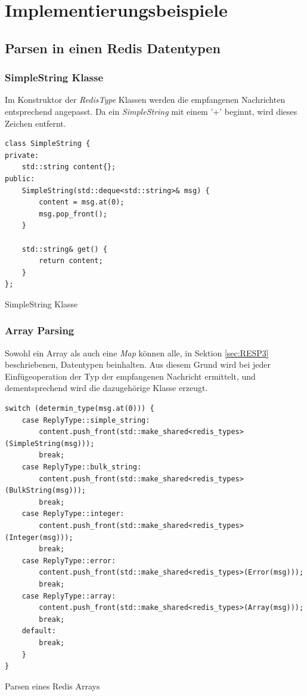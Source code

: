 \documentclass[12pt, letterpaper]{article}
\newenvironment{code}{\captionsetup{type=listing}}{}
\begin{document}
\section{Implementierungsbeispiele}
\subsection{Parsen in einen Redis Datentypen}

\subsubsection{SimpleString Klasse}
Im Konstruktor der \textit{RedisType} Klassen werden die empfangenen Nachrichten entsprechend angepasst. Da ein \textit{SimpleString} mit einem '+' beginnt, wird dieses Zeichen entfernt.

\begin{code}
\begin{verbatim}
class SimpleString {
private:
    std::string content{};
public:
    SimpleString(std::deque<std::string>& msg) {
        content = msg.at(0);
        msg.pop_front();
    }

    std::string& get() {
        return content;
    }
};
\end{verbatim}
\caption{SimpleString Klasse}
\label{resolve_domain}
\end{code}

\subsubsection{Array Parsing}
Sowohl ein Array als auch eine \textit{Map} können alle, in Sektion \ref{sec:RESP3} beschriebenen, Datentypen beinhalten. Aus diesem Grund wird bei jeder Einfügeoperation der Typ der empfangenen Nachricht ermittelt, und dementsprechend wird die dazugehörige Klasse erzeugt.

\begin{code}
\begin{verbatim}
switch (determin_type(msg.at(0))) {
    case ReplyType::simple_string:
        content.push_front(std::make_shared<redis_types>(SimpleString(msg)));
        break;
    case ReplyType::bulk_string:
        content.push_front(std::make_shared<redis_types>(BulkString(msg)));
        break;
    case ReplyType::integer:
        content.push_front(std::make_shared<redis_types>(Integer(msg)));
        break;  
    case ReplyType::error:
        content.push_front(std::make_shared<redis_types>(Error(msg)));
        break;  
    case ReplyType::array:
        content.push_front(std::make_shared<redis_types>(Array(msg)));
        break;  
    default:
        break;
    }
}
\end{verbatim}
\caption{Parsen eines Redis Arrays}
\label{resolve_domain}
\end{code}
\end{document}
